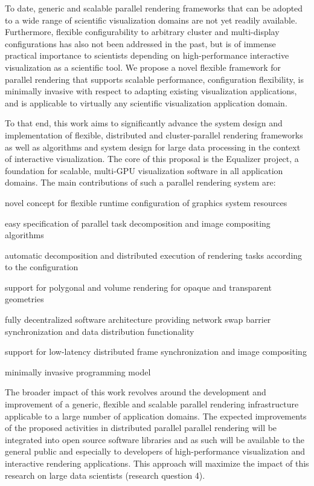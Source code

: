 To date, generic and scalable parallel rendering frameworks that can be adopted
to a wide range of scientific visualization domains are not yet readily
available. Furthermore, flexible configurability to arbitrary cluster and
multi-display configurations has also not been addressed in the past, but is of
immense practical importance to scientists depending on high-performance
interactive visualization as a scientific tool. We propose a novel flexible
framework for parallel rendering that supports scalable performance,
configuration flexibility, is minimally invasive with respect to adapting
existing visualization applications, and is applicable to virtually any
scientific visualization application domain.

To that end, this work aims to significantly advance the system design and
implementation of flexible, distributed and cluster-parallel rendering
frameworks as well as algorithms and system design for large data processing in
the context of interactive visualization. The core of this proposal is the
Equalizer project, a foundation for scalable, multi-GPU visualization software
in all application domains. The main contributions of such a parallel rendering
system are:
%
\begin{compactenum}
\item novel concept for flexible runtime configuration of graphics system resources
\item easy specification of parallel task decomposition and image compositing algorithms
\item automatic decomposition and distributed execution of rendering tasks according to the configuration
\item support for polygonal and volume rendering for opaque and transparent geometries
\item fully decentralized software architecture providing network swap barrier synchronization and data distribution functionality
\item support for low-latency distributed frame synchronization and image compositing
\item minimally invasive programming model
\end{compactenum}

The broader impact of this work revolves around the development and improvement
of a generic, flexible and scalable parallel rendering infrastructure applicable
to a large number of application domains. The expected improvements of the
proposed activities in distributed parallel parallel rendering will be
integrated into open source software libraries and as such will be available to
the general public and especially to developers of high-performance
visualization and interactive rendering applications. This approach will
maximize the impact of this research on large data scientists (research question
4).

